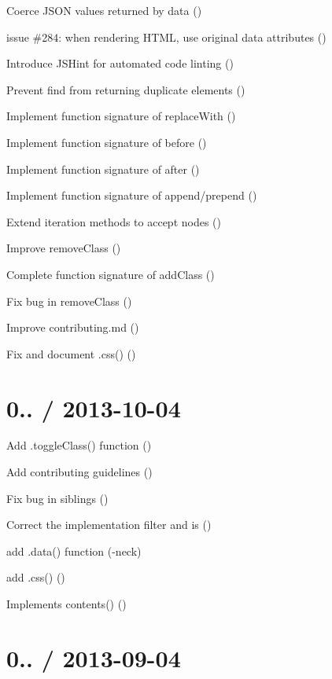 \begin{DoxyItemize}
\item Coerce J\+S\+ON values returned by {\ttfamily data} ()
\item issue \#284\+: when rendering H\+T\+ML, use original data attributes ()
\item Introduce J\+S\+Hint for automated code linting ()
\item Prevent {\ttfamily find} from returning duplicate elements ()
\item Implement function signature of {\ttfamily replace\+With} ()
\item Implement function signature of {\ttfamily before} ()
\item Implement function signature of {\ttfamily after} ()
\item Implement function signature of {\ttfamily append}/{\ttfamily prepend} ()
\item Extend iteration methods to accept nodes ()
\item Improve {\ttfamily remove\+Class} ()
\item Complete function signature of {\ttfamily add\+Class} ()
\item Fix bug in {\ttfamily remove\+Class} ()
\item Improve contributing.\+md ()
\item Fix and document .css() ()
\end{DoxyItemize}

\section*{0.. / 2013-\/10-\/04 }


\begin{DoxyItemize}
\item Add .toggle\+Class() function ()
\item Add contributing guidelines ()
\item Fix bug in {\ttfamily siblings} ()
\item Correct the implementation {\ttfamily filter} and {\ttfamily is} ()
\item add .data() function (-\/neck)
\item add .css() ()
\item Implements contents() ()
\end{DoxyItemize}

\section*{0.. / 2013-\/09-\/04 }


